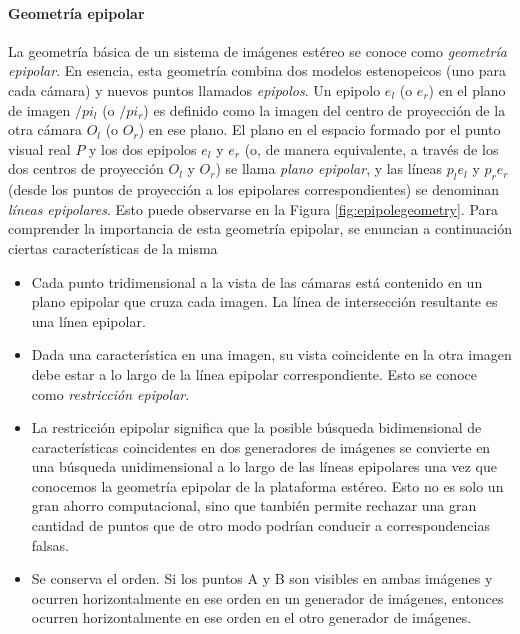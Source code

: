 \paragraph{Geometría epipolar}
La geometría básica de un sistema de imágenes estéreo se conoce como \textit{geometría epipolar}. En esencia, esta geometría combina dos modelos estenopeicos (uno para cada cámara) y nuevos puntos llamados \textit{epipolos}. Un epipolo $e_l$ (o $e_r$) en el plano de imagen $/pi_l$ (o $/pi_r$) es definido como la imagen del centro de proyección de la otra cámara $O_l$ (o $O_r$) en ese plano. El plano en el espacio formado por el punto visual real $P$ y los dos epipolos $e_l$ y $e_r$ (o, de manera equivalente, a través de los dos centros de proyección $O_l$
y $O_r$) se llama \textit{plano epipolar}, y las líneas $p_le_l$ y $p_re_r$ (desde los puntos de proyección a los epipolares correspondientes) se denominan \textit{líneas epipolares}. Esto puede observarse en la Figura \ref{fig:epipolegeometry}. Para comprender la importancia de esta geometría epipolar, se enuncian a continuación ciertas características de la misma
\begin{itemize}
    \item Cada punto tridimensional a la vista de las cámaras está contenido en un plano epipolar que cruza cada imagen. La línea de intersección resultante es una línea epipolar.
    \item Dada una característica en una imagen, su vista coincidente en la otra imagen debe estar a lo largo de la línea epipolar correspondiente. Esto se conoce como \textit{restricción epipolar}.
    \item La restricción epipolar significa que la posible búsqueda bidimensional de características coincidentes en dos generadores de imágenes se convierte en una búsqueda unidimensional a lo largo de las líneas epipolares una vez que conocemos la geometría epipolar de la plataforma estéreo. Esto no es solo un gran ahorro computacional, sino que también permite rechazar una gran cantidad de puntos que de otro modo podrían conducir a correspondencias falsas.
    \item Se conserva el orden. Si los puntos A y B son visibles en ambas imágenes y ocurren horizontalmente en ese orden en un generador de imágenes, entonces ocurren horizontalmente en ese orden en el otro generador de imágenes.
\end{itemize}

